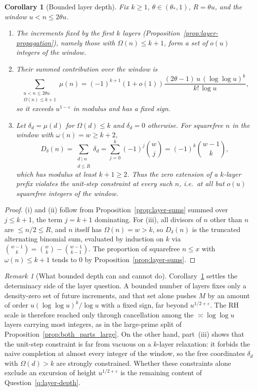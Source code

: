 \documentclass[11pt]{amsart}
\numberwithin{equation}{section}
\theoremstyle{plain}
\newtheorem{corollary}[theorem]{Corollary}
\theoremstyle{definition}
\theoremstyle{remark}
\newtheorem{remark}[theorem]{Remark}
\newcommand{\eps}{\varepsilon}
\begin{document}
\begin{corollary}[Bounded layer depth]
\label{cor:bounded-depth}
Fix $k\ge1$, $\theta\in(\theta_*,1)$, $R=\theta u$, and the window
$u<n\le2\theta u$.
\begin{enumerate}[label=\textup{(\roman*)}]
\item The increments fixed by the first $k$ layers
(Proposition~\ref{prop:layer-propagation}), namely those with
$\Omega(n)\le k+1$, form a set of $o(u)$ integers of the window.
\item Their summed contribution over the window is
\[
\sum_{\substack{u<n\le2\theta u\\ \Omega(n)\le k+1}}\mu(n)
=(-1)^{k+1}(1+o(1))\frac{(2\theta-1)\,u\,(\log\log u)^{k}}{k!\,\log u},
\]
so it exceeds $u^{1-\eps}$ in modulus and has a fixed sign.
\item Let $\delta_d=\mu(d)$ for $\Omega(d)\le k$ and $\delta_d=0$ otherwise.
For squarefree $n$ in the window with $\omega(n)=w\ge k+2$,
\[
D_\delta(n)=\sum_{\substack{d\mid n\\ d\le R}}\delta_d
=\sum_{j=0}^{k}(-1)^j\binom wj=(-1)^k\binom{w-1}{k},
\]
which has modulus at least $k+1\ge2$. Thus the zero extension of a
$k$-layer prefix violates the unit-step constraint at every such $n$, i.e.\
at all but $o(u)$ squarefree integers of the window.
\end{enumerate}
\end{corollary}

\begin{proof}
(i) and (ii) follow from Proposition~\ref{prop:layer-sums} summed over
$j\le k+1$, the term $j=k+1$ dominating. For (iii), all divisors of $n$
other than $n$ are $\le n/2\le R$, and $n$ itself has $\Omega(n)=w>k$, so
$D_\delta(n)$ is the truncated alternating binomial sum, evaluated by
induction on $k$ via $\binom{w-1}{k}=\binom wk-\binom{w-1}{k-1}$. The
proportion of squarefree $n\le x$ with $\omega(n)\le k+1$ tends to $0$ by
Proposition~\ref{prop:layer-sums}.
\end{proof}

\begin{remark}[What bounded depth can and cannot do]
\label{rem:depth-content}
Corollary~\ref{cor:bounded-depth} settles the determinacy side of the
layer question. A bounded number of layers fixes only a density-zero set of
future increments, and that set alone pushes $M$ by an amount of order
$u(\log\log u)^k/\log u$ with a fixed sign, far beyond $u^{1/2+\eps}$. The
RH scale is therefore reached only through cancellation among the
$\asymp\log\log u$ layers carrying most integers, as in the large-prime
split of Proposition~\ref{prop:both_parts_large}. On the other hand,
part~(iii) shows that the unit-step constraint is far from vacuous on a
$k$-layer relaxation: it forbids the naive completion at almost every
integer of the window, so the free coordinates $\delta_d$ with
$\Omega(d)>k$ are strongly constrained. Whether these constraints alone
exclude an excursion of height $u^{1/2+\eps}$ is the remaining content of
Question~\ref{q:layer-depth}.
\end{remark}
\end{document}
